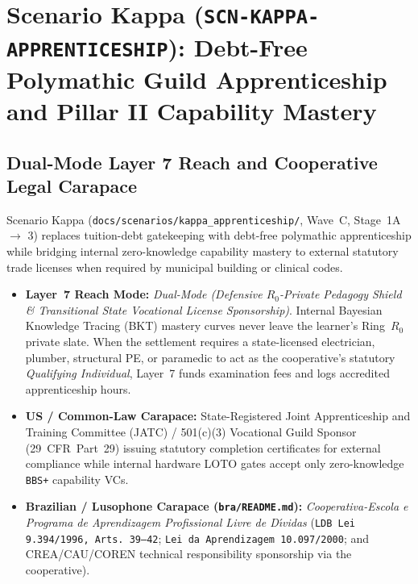 \chapter{Scenario Kappa (\texttt{SCN-KAPPA-APPRENTICESHIP}): Debt-Free Polymathic Guild Apprenticeship and Pillar II Capability Mastery}
\label{app:scenario-kappa}

\section{Dual-Mode Layer 7 Reach and Cooperative Legal Carapace}
Scenario Kappa (\texttt{docs/scenarios/kappa\_apprenticeship/}, Wave~C, Stage~1A $\to$ 3) replaces tuition-debt gatekeeping with debt-free polymathic apprenticeship while bridging internal zero-knowledge capability mastery to external statutory trade licenses when required by municipal building or clinical codes.
\begin{itemize}
    \item \textbf{Layer~7 Reach Mode:} \textit{Dual-Mode (Defensive $R_0$-Private Pedagogy Shield \& Transitional State Vocational License Sponsorship)}. Internal Bayesian Knowledge Tracing (BKT) mastery curves never leave the learner's Ring~$R_0$ private slate. When the settlement requires a state-licensed electrician, plumber, structural PE, or paramedic to act as the cooperative's statutory \textit{Qualifying Individual}, Layer~7 funds examination fees and logs accredited apprenticeship hours.
    \item \textbf{US / Common-Law Carapace:} State-Registered Joint Apprenticeship and Training Committee (JATC) / 501(c)(3) Vocational Guild Sponsor (29~CFR~Part~29) issuing statutory completion certificates for external compliance while internal hardware LOTO gates accept only zero-knowledge \texttt{BBS+} capability VCs.
    \item \textbf{Brazilian / Lusophone Carapace (\texttt{bra/README.md}):} \textit{Cooperativa-Escola e Programa de Aprendizagem Profissional Livre de D{\'\i}vidas} (\texttt{LDB Lei 9.394/1996, Arts.~39--42}; \texttt{Lei da Aprendizagem 10.097/2000}; and CREA/CAU/COREN technical responsibility sponsorship via the cooperative).
\end{itemize}

